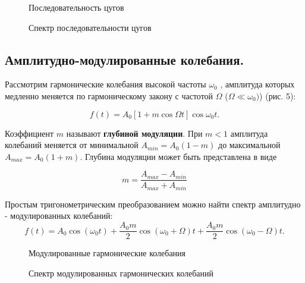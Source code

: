 \documentclass[a4paper, 14pt]{extarticle}%
\begin{document}
	\begin{figure}[h]
		\begin{minipage}[h]{0.5\linewidth}
			\caption{Последовательность цугов}
		\end{minipage}
		\begin{minipage}[h]{0.5\linewidth}
			\caption{Спектр последовательности цугов}
		\end{minipage}
	\end{figure}

	\subsection{Амплитудно-модулированные колебания.}
	Рассмотрим гармонические колебания высокой частоты $\omega_{0}$ , амплитуда которых медленно меняется по гармоническому закону с частотой $\Omega$ ($\Omega \ll \omega_{0})$) (рис. 5):
	
	$$f(t)=A_{0}[1+m\cos\Omega t]\cos \omega_{0}t.$$
	
	Коэффициент $m$ называют \textbf{глубиной модуляции}. При $m<1$ амплитуда колебаний меняется от минимальной $A_{min}=A_{0}(1-m)$ до максимальной $A_{max}=A_{0}(1+m).$ Глубина модуляции может быть представлена в виде
	
\begin{equation}\label{m}
	 m=\dfrac{A_{max}-A_{min}}{A_{max}+A_{min}}
\end{equation}
	
	Простым тригонометрическим преобразованием можно найти спектр амплитудно - модулированных колебаний:
	\\
\begin{equation}\label{a}
	f(t)=A_{0}\cos(\omega_{0} t)+\dfrac{A_{0}m}{2}\cos(\omega_{0}+\Omega)t+\dfrac{A_{0}m}{2}\cos(\omega_{0}-\Omega)t.
\end{equation}
		
		\begin{figure}[h]
			\begin{minipage}[h]{0.5\linewidth}
				\caption{Модулированные гармонические колебания}
			\end{minipage}
			\begin{minipage}[h]{0.5\linewidth}
				\caption{Спектр модулированных гармонических колебаний}
			\end{minipage}
		\end{figure}
		
\end{document}
